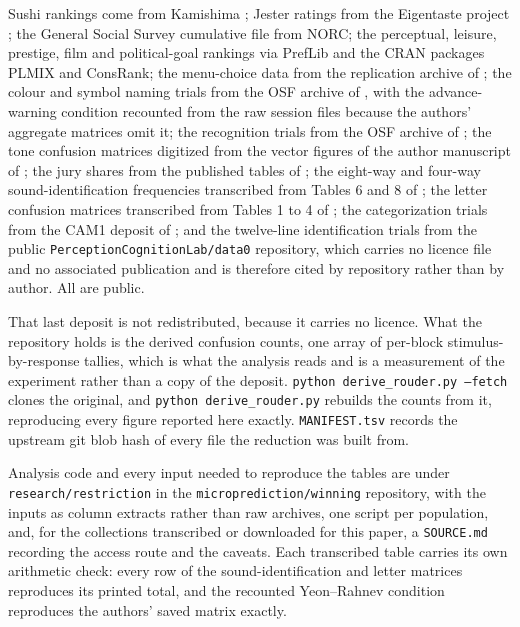 \documentclass[11pt]{article}
\theoremstyle{italichead}
\begin{document}
Sushi rankings come from Kamishima \cite{kamishima2003}; Jester ratings from the
Eigentaste project \cite{goldberg2001}; the General Social Survey cumulative file from
NORC; the perceptual, leisure, prestige, film and political-goal rankings via PrefLib
\cite{mattei2013} and the CRAN packages PLMIX and ConsRank; the menu-choice data from
the replication archive of \cite{costagomes2022}; the colour and symbol naming trials from
the OSF archive of \cite{yeonrahnev2020}, with the advance-warning condition recounted from
the raw session files because the authors' aggregate matrices omit it; the recognition
trials from the OSF archive of \cite{utochkin2025}; the tone confusion matrices digitized
from the vector figures of the author manuscript of \cite{stewart2005}; the jury shares from
the published tables of \cite{ormston2019}; the eight-way and four-way sound-identification
frequencies transcribed from Tables 6 and 8 of \cite{getty1979}; the letter confusion matrices
transcribed from Tables 1 to 4 of \cite{townsendlandon1982}; the categorization trials from the
CAM1 deposit of \cite{wills2000}; and the twelve-line identification trials from the public
\texttt{PerceptionCognitionLab/data0} repository, which carries no licence file and no
associated publication and is therefore cited by repository rather than by author. All are public.

That last deposit is not redistributed, because it carries no licence. What the repository holds is the derived confusion counts, one array of per-block
stimulus-by-response tallies, which is what the analysis reads and is a measurement of the
experiment rather than a copy of the deposit. \texttt{python derive\_rouder.py --fetch} clones
the original, and \texttt{python derive\_rouder.py} rebuilds the counts from it, reproducing
every figure reported here exactly. \texttt{MANIFEST.tsv} records the upstream git blob hash
of every file the reduction was built from.

\begin{sloppypar}
Analysis code and every input needed to reproduce the tables are under
\texttt{research/\allowbreak restriction} in the \texttt{microprediction/\allowbreak winning}
repository, with the
inputs as column extracts rather than raw archives, one script per population, and, for the
collections transcribed or downloaded for this paper, a \texttt{SOURCE.md} recording the
access route and the caveats. Each transcribed table carries its own arithmetic check: every
row of the sound-identification and letter matrices reproduces its printed total, and the
recounted Yeon--Rahnev condition reproduces the authors' saved matrix exactly.
\end{sloppypar}
\end{document}
